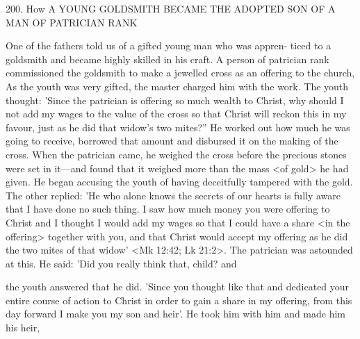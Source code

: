 200.
How A YOUNG GOLDSMITH
BECAME THE ADOPTED
SON OF A MAN OF PATRICIAN RANK

One of the fathers told us of a gifted young man who was appren-
ticed to a goldsmith and became highly skilled in his craft.
A person
of patrician rank commissioned the goldsmith to make a jewelled
cross as an offering to the church, As the youth was very gifted, the
master charged him with the work.
The youth thought: 'Since the
patrician is offering so much wealth to Christ, why should I not add
my wages to the value of the cross so that Christ will reckon this in
my favour, just as he did that widow's two mites?” He worked out
how much he was going to receive, borrowed that amount and
disbursed it on the making of the cross.
When the patrician came,
he weighed the cross before the precious stones were set in it—and
found that it weighed more than the mass <of gold> he had given.
He began accusing the youth of having deceitfully tampered with
the gold.
The other replied: 'He who alone knows the secrets of our
hearts is fully aware that I have done no such thing.
I saw how
much money you were offering to Christ and I thought I would add
my wages so that I could have a share <in the offering> together
with you, and that Christ would accept my offering as he did the
two mites of that widow' <Mk 12:42; Lk 21:2>.
The patrician was
astounded at this.
He said: 'Did you really think that, child? and

the youth answered that he did.
'Since you thought like that and
dedicated your entire course of action to Christ in order to gain a
share in my offering, from this day forward I make you my son and
heir'.
He took him with him and made him his heir,

